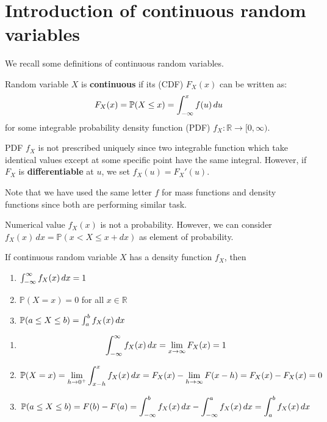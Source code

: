 \documentclass{huhtakm-template-book}
\newcommand{\prob}{\mathbb{P}}
\begin{document}
\section{Introduction of continuous random variables}
We recall some definitions of continuous random variables.
\begin{defn}
	Random variable $X$ is \textbf{continuous} if its  (CDF) $F_{X}(x)$ can be written as:
	\begin{equation*}
		F_{X}(x)=\prob(X\leq x)=\intlu{-\infty}{x}f(u)\,du
	\end{equation*}
	for some integrable probability density function (PDF) $f_{X}:\mathbb{R}\to[0,\infty)$.
\end{defn}
\begin{rem}
	PDF $f_{X}$ is not prescribed uniquely since two integrable function which take identical values except at some specific point have the same integral. However, if $F_{X}$ is \textbf{differentiable} at $u$, we set $f_{X}(u)=F_{X}'(u)$.
\end{rem}
Note that we have used the same letter $f$ for mass functions and density functions since both are performing similar task.
\begin{rem}
	Numerical value $f_{X}(x)$ is not a probability. However, we can consider $f_{X}(x)\,dx=\prob(x<X\leq x+dx)$ as element of probability.
\end{rem}
\begin{lem}
	\label{Chapter 5 (Lemma) Properties of PDF}
	If continuous random variable $X$ has a density function $f_{X}$, then
	\begin{enumerate}
		\item $\int_{-\infty}^{\infty} f_{X}(x)\,dx=1$
		\item $\prob(X=x)=0$ for all $x\in\mathbb{R}$
		\item $\prob(a\leq X\leq b)=\intlu{a}{b}f_{X}(x)\,dx$
	\end{enumerate}
\end{lem}
\begin{proofing}
	\begin{enumerate}
		\item 
		\begin{equation*}
			\int_{-\infty}^{\infty} f_{X}(x)\,dx=\lim_{x\to\infty}F_{X}(x)=1
		\end{equation*}
		\item
		\begin{equation*}
			\prob(X=x)=\lim_{h\to 0^{+}}\intlu{x-h}{x}f_{X}(x)\,dx=F_{X}(x)-\lim_{h\to\infty}F(x-h)=F_{X}(x)-F_{X}(x)=0
		\end{equation*}
		\item
		\begin{equation*}
			\prob(a\leq X\leq b)=F(b)-F(a)=\intlu{-\infty}{b}f_{X}(x)\,dx-\intlu{-\infty}{a}f_{X}(x)\,dx=\intlu{a}{b}f_{X}(x)\,dx
		\end{equation*}
	\end{enumerate}
\end{proofing}
\end{document}

